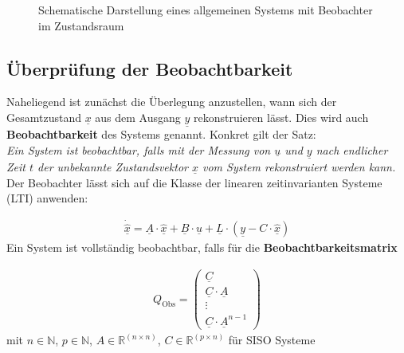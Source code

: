 \begin{figure}[H]
    \centering
    \caption[System mit Beobachter]{Schematische Darstellung eines allgemeinen Systems mit Beobachter im Zustandsraum}
    \label{fig:Bild44}
\end{figure}

\subsection{Überprüfung der Beobachtbarkeit}

Naheliegend ist zunächst die Überlegung anzustellen, wann sich der Gesamtzustand $\underline{x}$ aus dem Ausgang $\underline{y}$ rekonstruieren lässt. Dies wird auch \textbf{Beobachtbarkeit} des Systems genannt. Konkret gilt der Satz: \\
\newline
\textit{Ein System ist beobachtbar, falls mit der Messung von $\underline{u}$ und $\underline{y}$ nach endlicher Zeit $t$ der unbekannte Zustandsvektor $\underline{x}$ vom System rekonstruiert werden kann.} \\
\newline
Der Beobachter lässt sich auf die Klasse der linearen zeitinvarianten Systeme (LTI) anwenden:

\begin{align}
    \underline{\dot{\hat{x}}} = \underline{A} \cdot \underline{\hat{x}} + \underline{B} \cdot \underline{u} + \underline{L} \cdot\left( \underline{y} - C \cdot \underline{\hat{x}}\right)
\end{align}
\newline
Ein System ist vollständig beobachtbar, falls für die \textbf{Beobachtbarkeitsmatrix}

\begin{align}
    Q_{\mathrm{Obs}} =
    \begin{pmatrix}
        \underline{C} \\
        \underline{C} \cdot \underline{A} \\
        \vdots \\
        \underline{C} \cdot \underline{A}^{n - 1}
    \end{pmatrix}
\end{align}
\newline
mit $n\in\mathbb{N}$, $p\in\mathbb{N}$, $A\in\mathbb{R}^{(n\times n)}$, $C\in\mathbb{R}^{(p\times n)}$ für SISO Systeme

